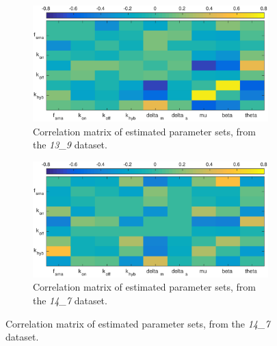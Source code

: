 \documentclass[10pt,journal]{./IEEE_latex_class/IEEEtran}
\begin{document}
\begin{figure}
        \begin{subfigure}[c]{0.49\textwidth}
        \centering
    \includegraphics[scale = 0.25, clip = true, trim = 100 0 90 0]{13_9_heatmap.eps}
        \caption{Correlation matrix of estimated parameter sets, from the  \textit{13\_9} dataset. }
    \end{subfigure}
    \begin{subfigure}[c]{0.49\textwidth}
    \centering
        \includegraphics[scale = 0.25, clip = true, trim = 80 0 70 0]{14_7_heatmap.eps}
        \caption{Correlation matrix of estimated parameter sets, from the  \textit{14\_7} dataset.}
    \end{subfigure}
    

\end{figure}
\end{document}
